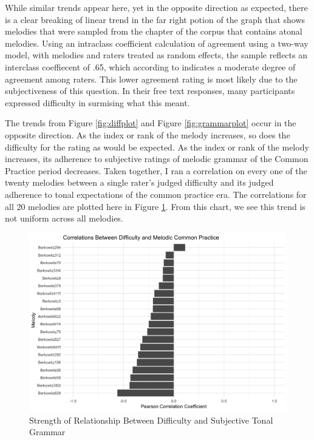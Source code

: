 \documentclass[12pt,]{book}
\begin{document}
While similar trends appear here, yet in the opposite direction as expected, there is a clear breaking of linear trend in the far right potion of the graph that shows melodies that were sampled from the chapter of the corpus that contains atonal melodies.
Using an intraclass coefficient calculation of agreement using a two-way model, with melodies and raters treated as random effects, the sample reflects an interclass coeffiecent of .65, which according to \citet{kooGuidelineSelectingReporting2016} indicates a moderate degree of agreement among raters.
This lower agreement rating is most likely due to the subjectiveness of this question.
In their free text responses, many participants expressed difficulty in surmising what this meant.

The trends from Figure \ref{fig:diffplot} and Figure \ref{fig:grammarplot} occur in the opposite direction.
As the index or rank of the melody increases, so does the difficulty for the rating as would be expected.
As the index or rank of the melody increases, its adherence to subjective ratings of melodic grammar of the Common Practice period decreases.
Taken together, I ran a correlation on every one of the twenty melodies between a single rater's judged difficulty and its judged adherence to tonal expectations of the common practice era.
The correlations for all 20 melodies are plotted here in Figure \ref{fig:gramcor}.
From this chart, we see this trend is not uniform across all melodies.

\begin{figure}

{\centering \includegraphics[width=1\linewidth]{img/grammar_difficulty_correlation_plot} 

}

\caption{Strength of Relationship Between Difficulty and Subjective Tonal Grammar}\label{fig:gramcor}
\end{figure}
\end{document}
